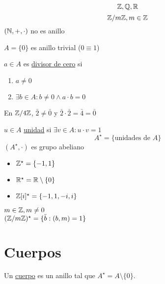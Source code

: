     \begin{ejm}
        \[\mathbb{Z},\mathbb{Q},\mathbb{R}\]
        \[\mathbb{Z}/m\mathbb{Z},m\in\mathbb{Z}\]
        $(\mathbb{N},+,\cdot)$ no es anillo
    \end{ejm}

    \begin{obs}
        $A=\{0\}$ es anillo trivial ($0\equiv 1$)
    \end{obs}

    \begin{defn}
        $a\in A$ es \underline{divisor de cero} si
        \begin{enumerate}
            \item $a\neq 0$

            \item $\exists b\in A: b\neq0 \wedge a\cdot b=0$
        \end{enumerate}
    \end{defn}

    \begin{ejm}
        En $\mathbb{Z}/4\mathbb{Z}$, $\bar{2}\neq\bar{0}$ y $\bar{2}\cdot\bar{2}=\bar{4}=\bar{0}$
    \end{ejm}

    \begin{defn}[Unidad]
        $u\in A$ \underline{unidad} si $\exists v\in A: u\cdot v=1$
        \[A^\star=\{\text{unidades de }A\}\]
        $(A^\star,\cdot)$ es grupo abeliano
    \end{defn}

    \begin{ejm}
        \hfill
        \begin{itemize}
            \item $\mathbb{Z}^\star=\{-1,1\}$

            \item $\mathbb{R}^\star=\mathbb{R}\setminus\{0\}$

            \item $\mathbb{Z}[i]^\star=\{-1,1,-i,i\}$
        \end{itemize}
    \end{ejm}

    \begin{eje}
        $m\in\mathbb{Z},m\neq 0$\\
        $(\mathbb{Z}/m\mathbb{Z})^\star=\{\bar{b}:(b,m)=1\}$
    \end{eje}

    \chapter{Cuerpos}
    \begin{defn}[Cuerpo]
        Un \underline{cuerpo} es un anillo tal que $A^\star=A\setminus\{0\}$.
    \end{defn}

